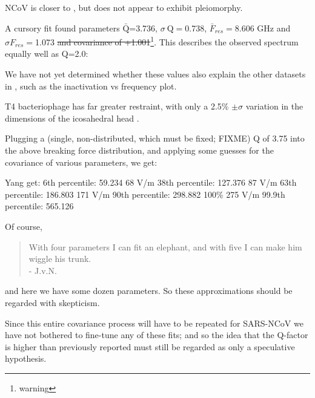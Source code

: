 \documentclass[paper.tex]{subfiles}
\begin{document}
\footnotemark


NCoV is closer to \cite{Viral2020}, but does not appear to exhibit pleiomorphy.

A cursory fit found parameters $\bar{\text{Q}}$=3.736,  $\sigma \ \text{Q} = $0.738, $\bar{F}_{res}=$8.606 GHz and $\sigma {F_{res}}=$1.073 \st{and covariance of +1.001}\footnote{warning}. This describes the observed spectrum equally well as Q=2.0:

We have not yet determined whether these values also explain the other datasets in \cite{Efficient2015}, such as the inactivation vs frequency plot.


T4 bacteriophage has far greater restraint, with only a 2.5\% $\pm \sigma$ variation in the dimensions of the icosahedral head \cite{Head1988}.\footnotemark



Plugging a (single, non-distributed, which must be fixed; FIXME) Q of 3.75 into the above breaking force distribution, and applying some guesses for the covariance of various parameters, we get:

								Yang get:
6th percentile: 59.234       68 V/m
38th percentile: 127.376		87 V/m
63th percentile: 186.803		171 V/m
90th percentile: 298.882     100\% 275 V/m
99.9th percentile: 565.126 

Of course, 
\begin{quote}
	With four parameters I can fit an elephant, and with five I can make him wiggle his trunk. \\- J.v.N.
\end{quote}

and here we have some dozen parameters. So these approximations should be regarded with skepticism.

Since this entire covariance process will have to be repeated for SARS-NCoV \footnotemark we have not bothered to fine-tune any of these fits; and so the idea that the Q-factor is higher than previously reported must still be regarded as only a speculative hypothesis.
\end{document}
